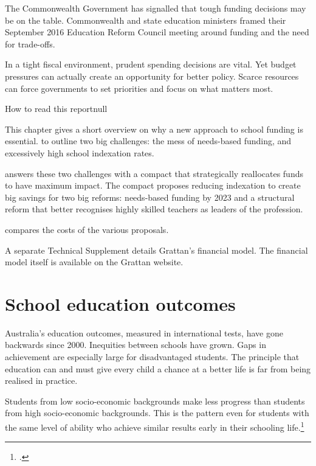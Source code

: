 \documentclass{grattan}
\begin{document}
The Commonwealth Government has signalled that tough funding decisions may be on the table.
Commonwealth and state education ministers framed their September 2016 Education Reform Council meeting around funding and the need for trade-offs.

In a tight fiscal environment, prudent spending decisions are vital.
Yet budget pressures can actually create an opportunity for better policy.
Scarce resources can force governments to set priorities and focus on what matters most.

\begin{addsmallbox}[p]{How to read this report}{null}

This chapter gives a short overview on why a new approach to school funding is essential.
 to  outline two big challenges: the mess of needs-based funding, and excessively high school indexation rates.

 answers these two challenges with a compact that strategically reallocates funds to have maximum impact.
The compact proposes reducing indexation to create big savings for two big reforms: needs-based funding by 2023 and a structural reform that better recognises highly skilled teachers as leaders of the profession.

 compares the costs of the various proposals.

A separate Technical Supplement details Grattan's financial model.
The financial model itself is available on the Grattan website.
\end{addsmallbox}

\section{School education outcomes}\label{sec:school-education-outcomes}
Australia's education outcomes, measured in international tests, have gone backwards since 2000.
Inequities between schools have grown.
Gaps in achievement are especially large for disadvantaged students. The principle that education can and must give every child a chance at a better life is far from being realised in practice.

Students from low socio-economic backgrounds make less progress than students from high socio-economic backgrounds. This is the pattern even for students with the same level of ability who achieve similar results early in their schooling life.\footcite{Goss-2016-Widening-gaps-NAPLAN}
\end{document}

